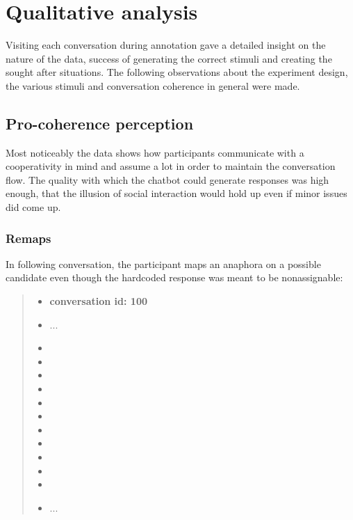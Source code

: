\section{Qualitative analysis}

Visiting each conversation during annotation
gave a detailed insight on the nature of the data,
success of generating the correct stimuli and
creating the sought after situations.
The following observations about
the experiment design, the various stimuli and conversation coherence in general
were made.

\subsection{Pro-coherence perception}

Most noticeably the data shows how participants communicate with a cooperativity in mind
and assume a lot in order to maintain the conversation flow.
The quality with which the chatbot could generate responses was high enough,
that the illusion of social interaction would hold up even if minor issues did come up.

\subsubsection{Remaps}

In following conversation, the participant maps an anaphora on a possible candidate
even though the hardcoded response was meant to be nonassignable:

    \begin{quote}
    \begin{itemize}[label={}, leftmargin=0pt, itemsep=0.5em]
    \item \textbf{conversation id: 100}
    \item ...
    \item {}
    \item {}
    \item {}
    \item {}
    \item {}
    \item {}
    \item {}
    \item {}
    \item {}
    \item {}
    \item {}
    \item ...
    \end{itemize}
    \end{quote}


